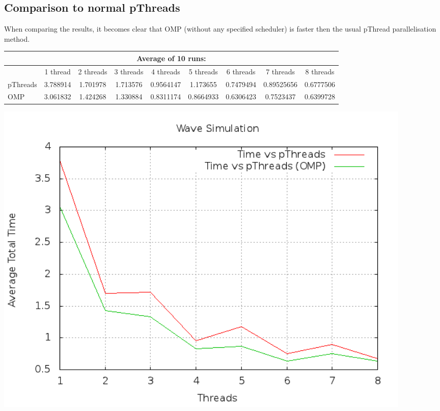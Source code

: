 \documentclass[a4paper]{article}
\begin{document}
    
  \subsection{Comparison to normal pThreads}
    When comparing the results, it becomes clear that OMP (without any specified scheduler) is faster then the usual pThread parallelisation method.\\
    \begin{tabular}{| l | c | c | c | c | c | c | c | c |}
      \hline
      \multicolumn{9}{|c|}{Average of 10 runs:}\\
      \hline
      & 1 thread & 2 threads & 3 threads & 4 threads & 5 threads & 6 threads & 7 threads & 8 threads\\
      \hline
      pThreads & 3.788914 & 1.701978 & 1.713576 & 0.9564147 & 1.173655 & 0.7479494 & 0.89525656 & 0.6777506\\
      \hline
      OMP & 3.061832 & 1.424268 & 1.330884 & 0.8311174 & 0.8664933 & 0.6306423 & 0.7523437 & 0.6399728\\
      \hline
    \end{tabular}
    \begin{center}
      \includegraphics[width=0.9\textwidth]{speedplot.png}
    \end{center}
    
\end{document}
